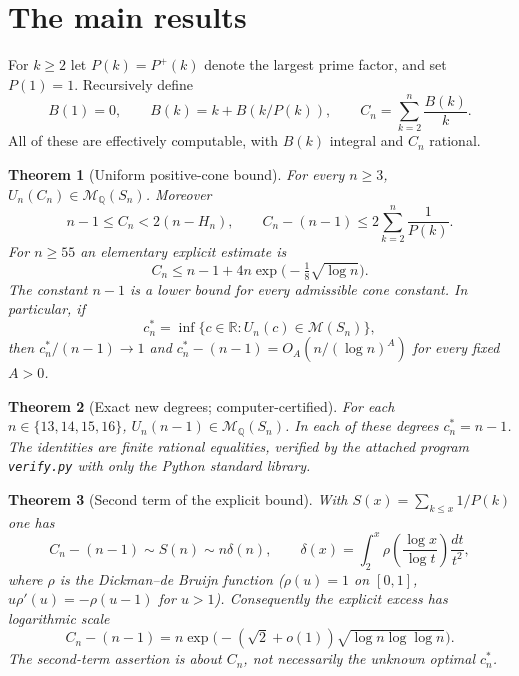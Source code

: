 \documentclass[11pt]{article}
\newtheorem{theorem}{Theorem}[section]
\theoremstyle{remark}
\newcommand{\Cone}{\mathcal{M}}
\newcommand{\Q}{\mathbb Q}
\newcommand{\R}{\mathbb R}
\begin{document}
\section{The main results}
For $k\ge2$ let $P(k)=P^+(k)$ denote the largest prime factor, and set $P(1)=1$. Recursively define
\begin{equation}\label{eq:B}
 B(1)=0,\qquad B(k)=k+B(k/P(k)),\qquad
 C_n=\sum_{k=2}^n\frac{B(k)}k .
\end{equation}
All of these are effectively computable, with $B(k)$ integral and $C_n$ rational.
\begin{theorem}[Uniform positive-cone bound]\label{thm:main}
For every $n\ge3$, $U_n(C_n)\in\Cone_{\Q}(S_n)$. Moreover
\begin{equation}\label{eq:comparison}
 n-1\le C_n < 2(n-H_n),\qquad
 C_n-(n-1)\le 2\sum_{k=2}^n\frac1{P(k)}.
\end{equation}
For $n\ge55$ an elementary explicit estimate is
\begin{equation}\label{eq:explicit}
 C_n\le n-1+4n\exp\bigl(-\tfrac18\sqrt{\log n}\bigr).
\end{equation}
The constant $n-1$ is a lower bound for every admissible cone constant. In particular, if
\[
 c_n^*=\inf\{c\in\R:U_n(c)\in\Cone(S_n)\},
\]
then $c_n^*/(n-1)\to1$ and $c_n^*-(n-1)=O_A(n/(\log n)^A)$ for every fixed $A>0$.
\end{theorem}
\begin{theorem}[Exact new degrees; computer-certified]\label{thm:finite}
For each $n\in\{13,14,15,16\}$, $U_n(n-1)\in\Cone_{\Q}(S_n)$. In each of these degrees $c_n^*=n-1$. The identities are finite rational equalities, verified by the attached program \texttt{verify.py} with only the Python standard library.
\end{theorem}
\begin{theorem}[Second term of the explicit bound]\label{thm:second}
With $S(x)=\sum_{k\le x}1/P(k)$ one has
\begin{equation}\label{eq:second}
 C_n-(n-1)\sim S(n)\sim n\delta(n),\qquad
 \delta(x)=\int_2^x \rho\!\left(\frac{\log x}{\log t}\right)\frac{dt}{t^2},
\end{equation}
where $\rho$ is the Dickman--de Bruijn function ($\rho(u)=1$ on $[0,1]$, $u\rho'(u)=-\rho(u-1)$ for $u>1$). Consequently the explicit excess has logarithmic scale
\[
 C_n-(n-1)=n\exp\bigl(-(\sqrt2+o(1))\sqrt{\log n\log\log n}\bigr).
\]
The second-term assertion is about $C_n$, not necessarily the unknown optimal $c_n^*$.
\end{theorem}
\end{document}
